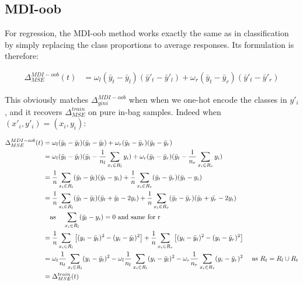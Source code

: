 \documentclass{article}
\begin{document}
\subsection{MDI-oob}
For regression, the MDI-oob method works exactly the same as in classification by simply replacing the class proportions to average responses. Its formulation is therefore:

\begin{align*}
    \Delta_{MSE}^{MDI-oob}(t) &= \omega_l (\bar{y}_t - \bar{y}_l)(\bar{y}'_t - \bar{y}'_l) + \omega_r (\bar{y}_t - \bar{y}_r)(\bar{y}'_t - \bar{y}'_r) 
\end{align*}

This obviously matches $\Delta_{gini}^{MDI-oob}$ when when we one-hot encode the classes in $y'_i$, and it recovers $\Delta_{MSE}^{train}$ on pure in-bag samples. Indeed when $(x'_i,y'_i) = (x_i,y_i)$:

\begin{align*}
    \Delta_{MSE}^{MDI-oob}(t) &= \omega_l (\bar{y}_t - \bar{y}_l)(\bar{y}_t - \bar{y}_l) + \omega_r (\bar{y}_t - \bar{y}_r)(\bar{y}_t - \bar{y}_r) \\
    &= \omega_l (\bar{y}_t - \bar{y}_l)(\bar{y}_t - \frac{1}{n_l}\sum_{x_i \in R_l} y_i) + \omega_r (\bar{y}_t - \bar{y}_r)(\bar{y}_t -  \frac{1}{n_r}\sum_{x_i \in R_r} y_i) \\
    &= \frac{1}{n}\sum_{x_i \in R_l} (\bar{y}_t - \bar{y}_l)(\bar{y}_t - y_i) +  \frac{1}{n}\sum_{x_i \in R_r}(\bar{y}_t - \bar{y}_r)(\bar{y}_t -  y_i) \\
    &= \frac{1}{n}\sum_{x_i \in R_l} (\bar{y}_t - \bar{y}_l)(\bar{y}_t + \bar{y}_l - 2y_i) +  \frac{1}{n}\sum_{x_i \in R_r}(\bar{y}_t - \bar{y}_r)(\bar{y}_t  + \bar{y_r} - 2 y_i) \\
    & \text{\quad as \quad $\sum_{x_i \in R_l} (\bar{y}_l - y_i) = 0$ and same for r}\\
    &= \frac{1}{n}\sum_{x_i \in R_l} \left[(y_i - \bar{y}_t)^2 - (y_i - \bar{y}_l)^2 \right] + \frac{1}{n}\sum_{x_i \in R_r}\left[(y_i - \bar{y}_t)^2 - (y_i - \bar{y}_r)^2 \right] \\
    &=  \omega_t \frac{1}{n_t} \sum_{x_i \in R_t}(y_i - \bar{y}_t)^2 - \omega_l \frac{1}{n_l} \sum_{x_i \in R_l}(y_i - \bar{y}_l)^2 - \omega_r \frac{1}{n_r} \sum_{x_i \in R_r}(y_i - \bar{y}_r)^2 \text{ \quad as $R_t = R_l \cup R_t$}\\
    &= \Delta_{MSE}^{train}(t)
\end{align*}

\end{document}
